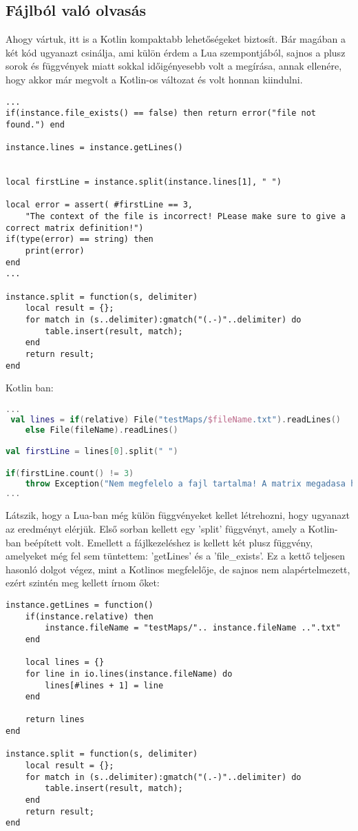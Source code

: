 \subsection{Fájlból való olvasás}
\normalsize
Ahogy vártuk, itt is a Kotlin kompaktabb lehetőségeket biztosít. Bár magában a két kód ugyanazt csinálja, ami külön érdem a Lua szempontjából, sajnos a plusz sorok és függvények miatt sokkal időigényesebb volt a megírása, annak ellenére, hogy akkor már megvolt a Kotlin-os változat és volt honnan kiindulni. 
\scriptsize
\begin{lstlisting}[style=Lua]
...
if(instance.file_exists() == false) then return error("file not found.") end

instance.lines = instance.getLines()


local firstLine = instance.split(instance.lines[1], " ")

local error = assert( #firstLine == 3,
	"The context of the file is incorrect! PLease make sure to give a correct matrix definition!")
if(type(error) == string) then
	print(error)
end
...

instance.split = function(s, delimiter)
	local result = {};
	for match in (s..delimiter):gmatch("(.-)"..delimiter) do
		table.insert(result, match);
	end
	return result;
end

\end{lstlisting}
Kotlin ban:
\scriptsize
\begin{lstlisting}[language = Kotlin]
...
 val lines = if(relative) File("testMaps/$fileName.txt").readLines()
	else File(fileName).readLines()

val firstLine = lines[0].split(" ")

if(firstLine.count() != 3)
	throw Exception("Nem megfelelo a fajl tartalma! A matrix megadasa helytelen!")
...
\end{lstlisting}
\normalsize
Látszik, hogy a Lua-ban még külön függvényeket kellet létrehozni, hogy ugyanazt az eredményt elérjük. Első sorban kellett egy 'split' függvényt, amely a Kotlin-ban beépített volt. Emellett a fájlkezeléshez is kellett két plusz függvény, amelyeket még fel sem tüntettem: 'getLines' és a 'file\_exists'. Ez a kettő teljesen hasonló dolgot végez, mint a Kotlinos megfelelője, de sajnos nem alapértelmezett, ezért szintén meg kellett írnom őket:
\newpage
\scriptsize
\begin{lstlisting}[style=Lua]
instance.getLines = function()
	if(instance.relative) then
		instance.fileName = "testMaps/".. instance.fileName ..".txt"
	end

	local lines = {}
	for line in io.lines(instance.fileName) do
		lines[#lines + 1] = line
	end
	
	return lines
end

instance.split = function(s, delimiter)
	local result = {};
	for match in (s..delimiter):gmatch("(.-)"..delimiter) do
		table.insert(result, match);
	end
	return result;
end

\end{lstlisting}
